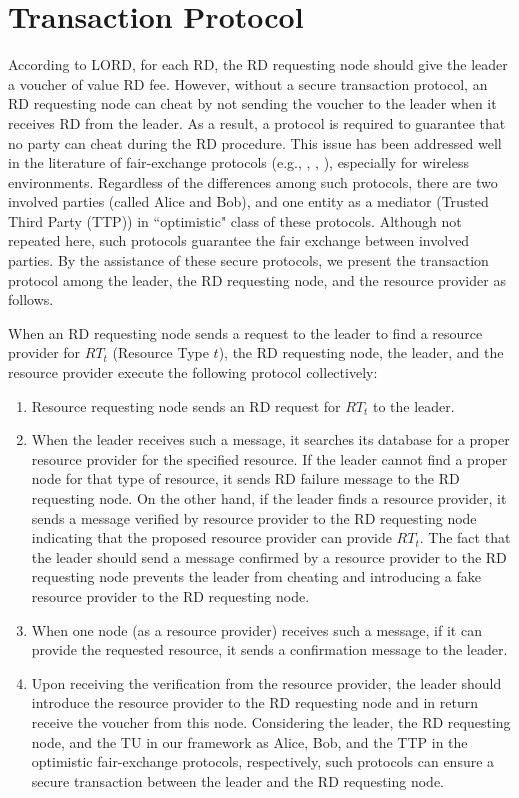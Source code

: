 \documentclass[journal,12pt, onecolumn]{IEEEtran}
\begin{document}
\section{Transaction Protocol}
\label{trans_protocol}

According to LORD, for each RD, the RD requesting node should give the leader a voucher of value RD fee. However, without a secure transaction protocol, an RD requesting node can cheat by not sending the voucher to the leader when it receives RD from the leader. As a result, a protocol is required to guarantee that no party can cheat during the RD procedure. This issue has been addressed well in the literature of fair-exchange protocols (e.g., \cite{x500}, \cite{x502}, \cite{x25}), especially for wireless environments. Regardless of the differences among such protocols, there are two involved parties (called Alice and Bob), and one entity as a mediator (Trusted Third Party (TTP)) in ``optimistic" class of these protocols. Although not repeated here, such protocols guarantee the fair exchange between involved parties. By the assistance of these secure protocols, we present the transaction protocol among the leader, the RD requesting node, and the resource provider as follows.

When an RD requesting node sends a request to the leader to find a resource provider for $RT_t$ (Resource Type $t$), the RD requesting node, the leader, and the resource provider execute the following protocol collectively: 
\begin{enumerate} 
\item Resource requesting node sends an RD request for $RT_{t}$ to the leader. 
\item When the leader receives such a message, it searches its database for a proper resource provider for the specified resource. If the leader cannot find a proper node for that type of resource, it sends RD failure message to the RD requesting node. On the other hand, if the leader finds a resource provider, it sends a message verified by resource provider to the RD requesting node indicating that the proposed resource provider can provide $RT_{t}$. The fact that the leader should send a message confirmed by a resource provider to the RD requesting node prevents the leader from cheating and introducing a fake resource provider to the RD requesting node.

\item When one node (as a resource provider) receives such a message, if it can provide the requested resource, it sends a confirmation message to the leader.
\item Upon receiving the verification from the resource provider, the leader should introduce the resource provider to the RD requesting node and in return receive the voucher from this node. Considering the leader, the RD requesting node, and the TU in our framework as Alice, Bob, and the TTP in the optimistic fair-exchange protocols, respectively, such protocols can ensure a secure transaction between the leader and the RD requesting node. 

\end{enumerate}
\end{document}
